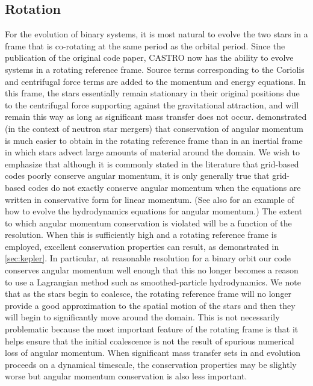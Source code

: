 \documentclass[iop]{../emulateapj}
\begin{document}
\subsection{Rotation}\label{sec:rotation}

For the evolution of binary systems, it is most natural to evolve the
two stars in a frame that is co-rotating at the same period as the
orbital period. Since the publication of the original code paper, CASTRO 
now has the ability to evolve systems in a rotating reference frame. 
Source terms corresponding to the Coriolis and centrifugal 
force terms are added to the momentum and energy equations. In this frame, 
the stars essentially remain stationary in their original positions due to the
centrifugal force supporting against the gravitational attraction, and
will remain this way as long as significant mass transfer does not
occur. \cite{swc:2000} demonstrated (in the context of neutron star
mergers) that conservation of angular momentum is much easier to
obtain in the rotating reference frame than in an inertial frame in
which stars advect large amounts of material around the domain. We
wish to emphasize that although it is commonly stated in the
literature that grid-based codes poorly conserve angular momentum,
it is only generally true that grid-based codes do not exactly conserve 
angular momentum when the equations are written in conservative form
for linear momentum. (See also \cite{motl:2002} for an example of how 
to evolve the hydrodynamics equations for angular momentum.) 
The extent to which angular momentum conservation is violated
will be a function of the resolution. When this is sufficiently high
and a rotating reference frame is employed, excellent conservation
properties can result, as demonstrated in \autoref{sec:kepler}. 
In particular, at reasonable resolution for a binary orbit our code 
conserves angular momentum well enough that this no longer becomes 
a reason to use a Lagrangian method such as smoothed-particle hydrodynamics.
We note that as the stars begin to coalesce, the rotating reference frame
will no longer provide a good approximation to the spatial motion of
the stars and then they will begin to significantly move around the
domain. This is not necessarily problematic because the most important
feature of the rotating frame is that it helps ensure that the initial
coalescence is not the result of spurious numerical loss of angular
momentum. When significant mass transfer sets in and evolution
proceeds on a dynamical timescale, the conservation properties may be
slightly worse but angular momentum conservation is also less
important.
\end{document}
